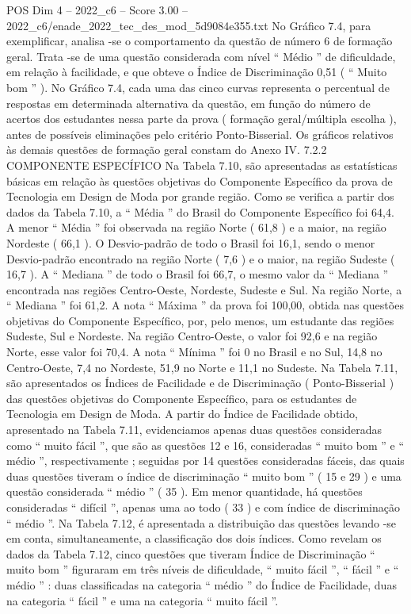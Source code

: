 \begin{textsample}{POS Dim 4 – 2022\_c6 – Score 3.00 – 2022\_c6/enade\_2022\_tec\_des\_mod\_5d9084e355.txt}
No Gráfico 7.4, para exemplificar, analisa -se o comportamento da questão de número 6 de formação geral.
Trata -se de uma questão considerada com nível “ Médio ” de dificuldade, em relação à facilidade, e que obteve o Índice de Discriminação 0,51 ( “ Muito bom ” ).
No Gráfico 7.4, cada uma das cinco curvas representa o percentual de respostas em determinada alternativa da questão, em função do número de acertos dos estudantes nessa parte da prova ( formação geral/múltipla escolha ), antes de possíveis eliminações pelo critério Ponto-Bisserial.
Os gráficos relativos às demais questões de formação geral constam do Anexo IV. 7.2.2 COMPONENTE ESPECÍFICO Na Tabela 7.10, são apresentadas as estatísticas básicas em relação às questões objetivas do Componente Específico da prova de Tecnologia em Design de Moda por grande região.
Como se verifica a partir dos dados da Tabela 7.10, a “ Média ” do Brasil do Componente Específico foi 64,4.
A menor “ Média ” foi observada na região Norte ( 61,8 ) e a maior, na região Nordeste ( 66,1 ).
O Desvio-padrão de todo o Brasil foi 16,1, sendo o menor Desvio-padrão encontrado na região Norte ( 7,6 ) e o maior, na região Sudeste ( 16,7 ).
A “ Mediana ” de todo o Brasil foi 66,7, o mesmo valor da “ Mediana ” encontrada nas regiões Centro-Oeste, Nordeste, Sudeste e Sul.
Na região Norte, a “ Mediana ” foi 61,2.
A nota “ Máxima ” da prova foi 100,00, obtida nas questões objetivas do Componente Específico, por, pelo menos, um estudante das regiões Sudeste, Sul e Nordeste.
Na região Centro-Oeste, o valor foi 92,6 e na região Norte, esse valor foi 70,4.
A nota “ Mínima ” foi 0 no Brasil e no Sul, 14,8 no Centro-Oeste, 7,4 no Nordeste, 51,9 no Norte e 11,1 no Sudeste.
Na Tabela 7.11, são apresentados os Índices de Facilidade e de Discriminação ( Ponto-Bisserial ) das questões objetivas do Componente Específico, para os estudantes de Tecnologia em Design de Moda.
A partir do Índice de Facilidade obtido, apresentado na Tabela 7.11, evidenciamos apenas duas questões consideradas como “ muito fácil ”, que são as questões 12 e 16, consideradas “ muito bom ” e “ médio ”, respectivamente ; seguidas por 14 questões consideradas fáceis, das quais duas questões tiveram o índice de discriminação “ muito bom ” ( 15 e 29 ) e uma questão considerada “ médio ” ( 35 ).
Em menor quantidade, há questões consideradas “ difícil ”, apenas uma ao todo ( 33 ) e com índice de discriminação “ médio ”.
Na Tabela 7.12, é apresentada a distribuição das questões levando -se em conta, simultaneamente, a classificação dos dois índices.
Como revelam os dados da Tabela 7.12, cinco questões que tiveram Índice de Discriminação “ muito bom ” figuraram em três níveis de dificuldade, “ muito fácil ”, “ fácil ” e “ médio ” : duas classificadas na categoria “ médio ” do Índice de Facilidade, duas na categoria “ fácil ” e uma na categoria “ muito fácil ”.

\end{textsample}
